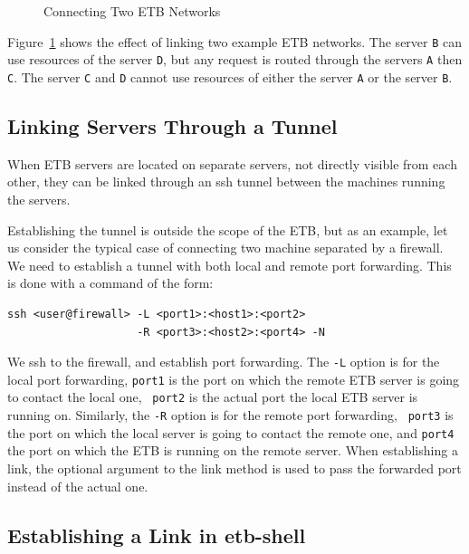 \documentclass{article}
\begin{document}
{\begin{figure}[h]
\caption{Connecting Two ETB Networks}
\label{fig:link}
\end{figure}
Figure~\ref{fig:link} shows the effect of linking two example ETB
networks. The server {\tt B} can use resources of the server {\tt D},
but any request is routed through the servers {\tt A} then {\tt C}.
The server {\tt C} and {\tt D} cannot use resources of either the
server {\tt A} or the server {\tt B}.

\subsection{Linking Servers Through a Tunnel}
\label{sec:using-links-connect}

When ETB servers are located on separate servers, not directly visible
from each other, they can be linked through an ssh tunnel between the
machines running the servers.

Establishing the tunnel is outside the scope of the ETB, but as an
example, let us consider the typical case of connecting two machine
separated by a firewall. We need to establish a tunnel with both local
and remote port forwarding. This is done with a command of the form:
\begin{verbatim}
ssh <user@firewall> -L <port1>:<host1>:<port2>
                    -R <port3>:<host2>:<port4> -N
\end{verbatim}
We ssh to the firewall, and establish port forwarding. The {\tt -L}
option is for the local port forwarding, {\tt port1} is the port on
which the remote ETB server is going to contact the local one, {\tt
  port2} is the actual port the local ETB server is running on.
Similarly, the {\tt -R} option is for the remote port forwarding, {\tt
  port3} is the port on which the local server is going to contact the
remote one, and {\tt port4} the port on which the ETB is running on
the remote server. When establishing a link, the optional argument to
the link method is used to pass the forwarded port instead of the
actual one.

\subsection{Establishing a Link in etb-shell}

}
\end{document}
